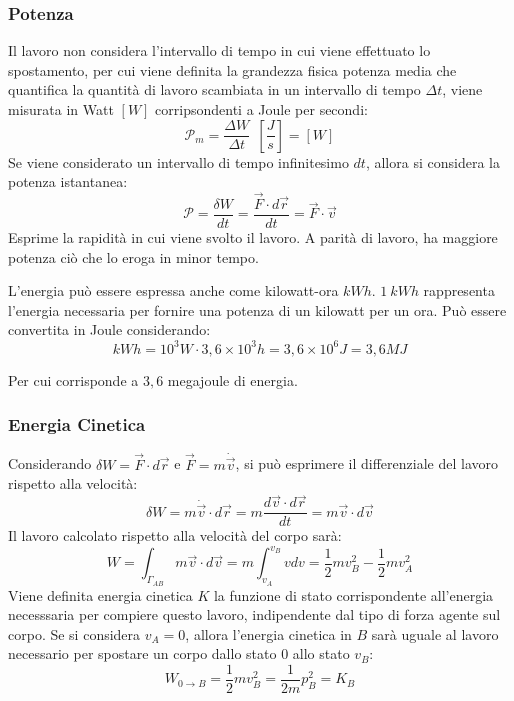 \documentclass{article}
\numberwithin{equation}{subsection}
\begin{document}
\subsubsection{Potenza}
Il lavoro non considera l'intervallo di tempo in cui viene effettuato 
lo spostamento, per cui viene definita la grandezza fisica potenza media 
che quantifica la quantità di lavoro scambiata in un intervallo 
di tempo $\Delta t$, viene misurata in Watt $[W]$ corripsondenti a Joule per secondi: 
\begin{equation*}
    \mathscr{P}_{m}=\displaystyle\frac{\Delta W}{\Delta t}\:\:\left[\displaystyle\frac{J}{s}\right]=[W]
\end{equation*}
Se viene considerato un intervallo di tempo infinitesimo $dt$, allora 
si considera la potenza istantanea:
\begin{equation}
    \mathscr{P}=\displaystyle\frac{\delta W}{dt}=\frac{\vec{F}\cdot d\vec{r}}{dt}=\vec{F}\cdot\vec{v}
\end{equation}
Esprime la rapidità in cui viene svolto il lavoro. A parità di lavoro, ha maggiore potenza ciò che lo eroga in minor tempo.  


L'energia può essere espressa anche come kilowatt-ora $kWh$. $1\:kWh$ rappresenta l'energia necessaria per fornire una potenza di un kilowatt per un ora. Può essere 
convertita in Joule considerando:
\begin{equation*}
    kWh=10^3W\cdot3,6\times10^3h=3,6\times10^6J=3,6MJ
\end{equation*}

Per cui corrisponde a $3,6$ megajoule di energia. 

\subsubsection{Energia Cinetica}
Considerando $\delta W=\vec{F}\cdot d\vec{r}$ e $\vec{F}=m\dot{\vec{v}}$, si può esprimere il differenziale del lavoro rispetto alla velocità:
\begin{equation*}
    \delta W=m\dot{\vec{v}}\cdot d\vec{r}=m\displaystyle\frac{d\vec{v}\cdot d\vec{r}}{dt}=m\vec{v}\cdot d\vec{v}
\end{equation*}
Il lavoro calcolato rispetto alla velocità del corpo sarà:
\begin{equation*}
    W=\int_{\Gamma_{AB}}m\vec{v}\cdot d\vec{v}=m\int_{v_A}^{v_B}vdv=\displaystyle\frac{1}{2}mv_B^2-\frac{1}{2}mv_A^2
\end{equation*}
Viene definita energia cinetica $K$ la funzione di stato corrispondente all'energia necesssaria per compiere questo 
lavoro, indipendente dal tipo di forza agente sul corpo. Se si 
considera $v_A=0$, allora l'energia cinetica in $B$ sarà uguale al 
lavoro necessario per spostare un corpo dallo stato $0$ allo stato $v_B$:
\begin{equation}
    W_{0\to B}=\displaystyle\frac{1}{2}mv_B^{2}=\frac{1}{2m}p^2_B=K_B
\end{equation}
\end{document}
